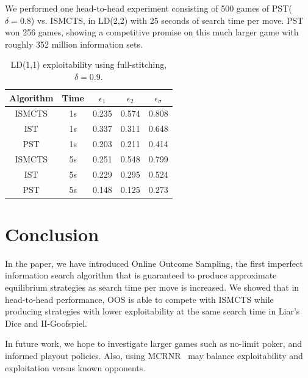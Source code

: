 \documentclass[letterpaper]{article}
\begin{document}
We performed one head-to-head experiment consisting of 500 games of PST($\delta = 0.8$) vs. ISMCTS, in LD(2,2)
with 25 seconds of search time per move. 
PST won 256 games, showing a competitive promise on 
this much larger game with roughly 352 million information sets. 


\begin{table}
{\small
\begin{center}
\begin{tabular}{ccccc}
Algorithm     & Time & $\epsilon_1$ & $\epsilon_2$ & $\epsilon_\sigma$ \\
\hline
ISMCTS        & 1s   & 0.235  & 0.574  & 0.808 \\
IST           & 1s   & 0.337  & 0.311  & 0.648 \\
PST           & 1s   & 0.203  & 0.211  & 0.414 \\
\hline
ISMCTS        & 5s   & 0.251  & 0.548  & 0.799 \\
IST           & 5s   & 0.229  & 0.295  & 0.524 \\
PST           & 5s   & 0.148  & 0.125  & 0.273 \\
\hline
\end{tabular}
\caption{LD(1,1) exploitability using full-stitching, $\delta = 0.9$.} 
\label{tbl:fullstitching}
\end{center}
}
\end{table}


\section{Conclusion}

In the paper, we have introduced Online Outcome Sampling, the first 
imperfect information search algorithm that is guaranteed to produce 
approximate equilibrium strategies as search time per move is increased. We 
showed that in head-to-head performance, OOS is able to compete with 
ISMCTS while producing strategies with lower exploitability
at the same search time in Liar's Dice and II-Goofspiel.

In future work, we hope to investigate larger games such as 
no-limit poker, and informed playout policies. 
Also, using MCRNR~\cite{Ponsen11Computing} 
may balance exploitability and exploitation versus known opponents.



\end{document}
